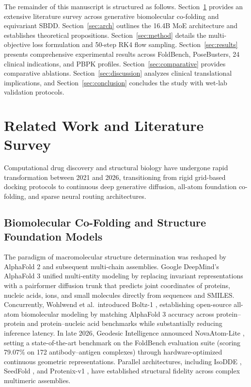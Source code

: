 \documentclass[10pt,journal,compsoc]{IEEEtran}
\begin{document}
The remainder of this manuscript is structured as follows. Section~\ref{sec:related} provides an extensive literature survey across generative biomolecular co-folding and equivariant SBDD. Section~\ref{sec:arch} outlines the 16.4B MoE architecture and establishes theoretical propositions. Section~\ref{sec:method} details the multi-objective loss formulation and 50-step RK4 flow sampling. Section~\ref{sec:results} presents comprehensive experimental results across FoldBench, PoseBusters, 24 clinical indications, and PBPK profiles. Section~\ref{sec:comparative} provides comparative ablations. Section~\ref{sec:discussion} analyzes clinical translational implications, and Section~\ref{sec:conclusion} concludes the study with wet-lab validation protocols.
\section{Related Work and Literature Survey}
\label{sec:related}
Computational drug discovery and structural biology have undergone rapid transformation between 2021 and 2026, transitioning from rigid grid-based docking protocols to continuous deep generative diffusion, all-atom foundation co-folding, and sparse neural routing architectures.

\subsection{Biomolecular Co-Folding and Structure Foundation Models}
The paradigm of macromolecular structure determination was reshaped by AlphaFold 2 and subsequent multi-chain assemblies. Google DeepMind's AlphaFold 3 \cite{abramson2024accurate} unified multi-entity modeling by replacing invariant representations with a pairformer diffusion trunk that predicts joint coordinates of proteins, nucleic acids, ions, and small molecules directly from sequences and SMILES. Concurrently, Wohlwend et al.\ introduced Boltz-1 \cite{wohlwend2024boltz1}, establishing open-source all-atom biomolecular modeling by matching AlphaFold 3 accuracy across protein--protein and protein--nucleic acid benchmarks while substantially reducing inference latency. In late 2026, Geodesic Intelligence announced NovaAtom-Lite \cite{geodesic2026novaatom}, setting a state-of-the-art benchmark on the FoldBench evaluation suite (scoring 79.07\% on 172 antibody--antigen complexes) through hardware-optimized continuous geometric representations. Parallel architectures, including IsoDDE \cite{fedde2023isodde}, SeedFold \cite{fedoseev2024seedfold}, and Protenix-v1 \cite{zheng2024protenix}, have established structural fidelity across complex multimeric assemblies.
\end{document}

